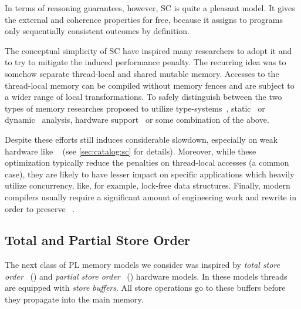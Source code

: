 In terms of reasoning guarantees, however, SC is quite a pleasant model. 
It gives the external \DRF and coherence properties for free, 
because it assigns to programs only sequentially consistent
outcomes by definition.

The conceptual simplicity of SC have inspired many researchers 
to adopt it and to try to mitigate the induced performance penalty.
The recurring idea was to somehow separate thread-local and shared mutable memory.
Accesses to the thread-local memory can be compiled 
without memory fences and are subject to a wider range 
of local transformations.
To safely distinguish between the two types of memory
researches proposed to utilize type-systems~\cite{Vollmer-al:PPoPP17},
static~\cite{Singh-al:ISCA12} or dynamic~\cite{Liu-al:PLDI19} analysis,
hardware support~\cite{Singh-al:ISCA12, Marino-al:PLDI10}
or some combination of the above. 

Despite these efforts \SC still induces considerable slowdown,
especially on weak hardware like ~\cite{Liu-al:PLDI19} 
(see \cref{sec:catalog:sc} for details).
Moreover, while these optimization typically reduce 
the penalties on thread-local accesses (a common case), 
they are likely to have lesser impact on specific 
applications which heavily utilize concurrency,
like, for example, lock-free data structures.
Finally, modern compilers usually require 
a significant amount of engineering work and rewrite
in order to preserve \SC~\cite{Marino-al:PLDI11, Liu-al:PLDI19}.

\subsection{Total and Partial Store Order}
\label{sec:analysis:tso}

The next class of PL memory models we consider 
was inspired by \emph{total store order}~\cite{Sewell-al:CACM10} (\TSO) 
and \emph{partial store order}~\cite{Sparc:94} (\PSO) hardware models. 
In these models threads are equipped with \emph{store buffers}.
All store operations go to these buffers before they 
propagate into the main memory.

